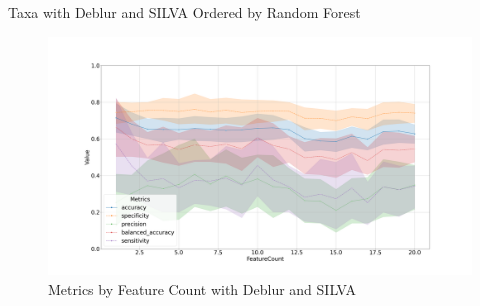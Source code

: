 \documentclass[a4paper]{article}
\begin{document}
{            \begin{table}[p]
                \centering
                \caption{Taxa with Deblur and SILVA Ordered by Random Forest}
                \label{tb:RF-every-Deblur-silva}

            \end{table}

            \begin{figure}[p]
                \centering
                \includegraphics[width=0.7 \linewidth]{figures/RandomForest/ANCOM.Deblur.silva/metrics.png}
                \caption{Metrics by Feature Count with Deblur and SILVA}
                \label{fig:RF-every-metrics-Deblur-silva}
            \end{figure}

}
\end{document}
